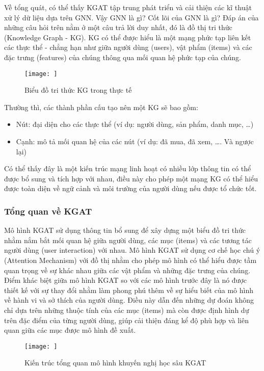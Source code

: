 Về tổng quát, có thể thấy KGAT tập trung phát triển và cải thiện các kĩ thuật xử lý dữ liệu dựa trên GNN. Vậy GNN là gì? Cốt lõi của GNN là gì? Đáp án của những câu hỏi trên nằm ở một câu trả lời duy nhất, đó là đồ thị tri thức (Knowledge Graph - KG). KG có thể được hiểu là một mạng phức tạp liên kết các thực thể - chẳng hạn như giữa người dùng (users), vật phẩm (items) và các đặc trưng (features) của chúng thông qua mối quan hệ phức tạp của chúng.

\begin{figure}[h]
    \centering
    \texttt{[image: ]}
    \caption{Biểu đồ tri thức KG trong thực tế}
    \label{fig:kg_example}
\end{figure}

Thường thì, các thành phần cấu tạo nên một KG sẽ bao gồm:
\begin{itemize}
    \item Nút: đại diện cho các thực thể (ví dụ: người dùng, sản phẩm, danh mục, …)
    \item Cạnh: mô tả mối quan hệ của các nút (ví dụ: đã mua, đã xem, …. Và ngược lại)
\end{itemize}

Có thể thấy đây là một kiến trúc mạng linh hoạt có nhiều lớp thông tin có thể được bổ sung và tích hợp với nhau, điều này cho phép một mạng KG có thể hiểu được toàn diện về ngữ cảnh và môi trường của người dùng nếu được tổ chức tốt.

\subsubsection{Tổng quan về KGAT}
Mô hình KGAT sử dụng thông tin bổ sung để xây dựng một biểu đồ tri thức nhằm nắm bắt mối quan hệ giữa người dùng, các mục (items) và các tương tác người dùng (user interaction) với nhau. Mô hình KGAT sử dụng cơ chế học chú ý (Attention Mechanism) với đồ thị nhằm cho phép mô hình có thể hiểu được tầm quan trọng về sự khác nhau giữa các vật phẩm và những đặc trưng của chúng. Điểm khác biệt giữa mô hình KGAT so với các mô hình trước đây là nó được thiết kế với sự thay đổi nhằm làm phong phú thêm về sự hiểu biết của mô hình về hành vi và sở thích của người dùng. Điều này dẫn đến những dự đoán không chỉ dựa trên những thuộc tính của các mục (items) mà còn được định hình dự trên đặc điểm của từng người dùng, giúp cải thiện đáng kể độ phù hợp và liên quan giữa các mục được mô hình đề xuất. 

\begin{figure}[h]
    \centering
    \texttt{[image: ]}
    \caption{Kiến trúc tổng quan mô hình khuyến nghị học sâu KGAT}
    \label{fig:kgat_model}
\end{figure}

